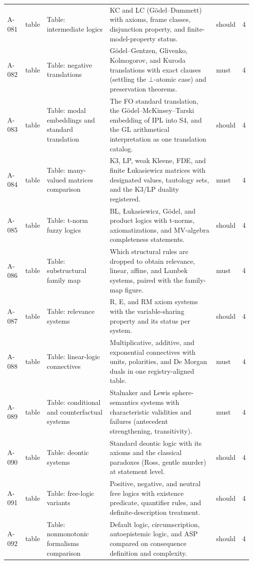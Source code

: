 \begin{longtable}{@{}p{0.45in}p{0.78in}p{2.02in}p{2.6in}p{0.42in}p{0.16in}@{}}
A-081 & table & Table: intermediate logics & KC and LC (G\"odel--Dummett) with axioms, frame classes, disjunction property, and finite-model-property status. & should & 4 \\
A-082 & table & Table: negative translations & G\"odel--Gentzen, Glivenko, Kolmogorov, and Kuroda translations with exact clauses (settling the \(\bot\)-atomic case) and preservation theorems. & must & 4 \\
A-083 & table & Table: modal embeddings and standard translation & The FO standard translation, the G\"odel--McKinsey--Tarski embedding of IPL into S4, and the GL arithmetical interpretation as one translation catalog. & should & 4 \\
A-084 & table & Table: many-valued matrices comparison & K3, LP, weak Kleene, FDE, and finite {\L}ukasiewicz matrices with designated values, tautology sets, and the K3/LP duality registered. & must & 4 \\
A-085 & table & Table: t-norm fuzzy logics & BL, {\L}ukasiewicz, G\"odel, and product logics with t-norms, axiomatizations, and MV-algebra completeness statements. & should & 4 \\
A-086 & table & Table: substructural family map & Which structural rules are dropped to obtain relevance, linear, affine, and Lambek systems, paired with the family-map figure. & must & 4 \\
A-087 & table & Table: relevance systems & R, E, and RM axiom systems with the variable-sharing property and its status per system. & should & 4 \\
A-088 & table & Table: linear-logic connectives & Multiplicative, additive, and exponential connectives with units, polarities, and De Morgan duals in one registry-aligned table. & must & 4 \\
A-089 & table & Table: conditional and counterfactual systems & Stalnaker and Lewis sphere-semantics systems with characteristic validities and failures (antecedent strengthening, transitivity). & must & 4 \\
A-090 & table & Table: deontic systems & Standard deontic logic with its axioms and the classical paradoxes (Ross, gentle murder) at statement level. & should & 4 \\
A-091 & table & Table: free-logic variants & Positive, negative, and neutral free logics with existence predicate, quantifier rules, and definite-description treatment. & should & 4 \\
A-092 & table & Table: nonmonotonic formalisms comparison & Default logic, circumscription, autoepistemic logic, and ASP compared on consequence definition and complexity. & should & 4 \\

\end{longtable}
